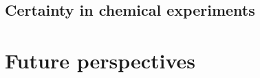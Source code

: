 \subsection{Certainty in chemical experiments}


\section{Future perspectives}



\cleardoublepage

